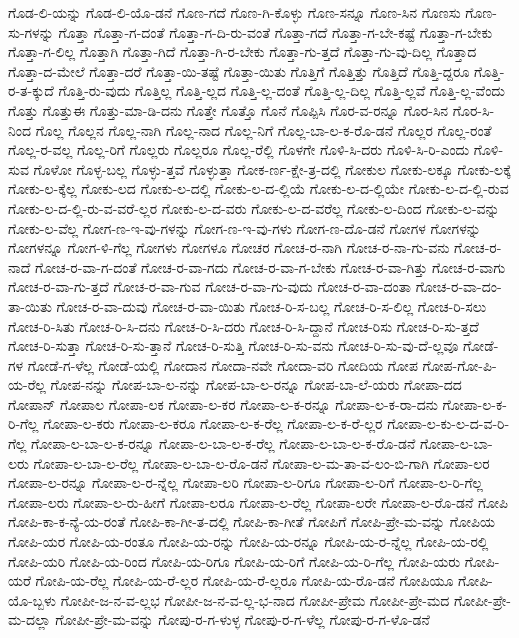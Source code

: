 {ಗೊಡ-ಲಿ-ಯನ್ನು
ಗೊಡ-ಲಿ-ಯೊ-ಡನೆ
ಗೊಣ-ಗದೆ
ಗೊಣ-ಗಿ-ಕೊಳ್ಳು
ಗೊಣ-ಸನ್ನೂ
ಗೊಣ-ಸಿನ
ಗೊಣಸು
ಗೊಣ-ಸು-ಗಳನ್ನು
ಗೊತ್ತಾ
ಗೊತ್ತಾ-ಗ-ದಂತೆ
ಗೊತ್ತಾ-ಗ-ದಿ-ರು-ವಂತೆ
ಗೊತ್ತಾ-ಗದೆ
ಗೊತ್ತಾ-ಗ-ಬೇ-ಕಷ್ಟೆ
ಗೊತ್ತಾ-ಗ-ಬೇಕು
ಗೊತ್ತಾ-ಗ-ಲಿಲ್ಲ
ಗೊತ್ತಾಗಿ
ಗೊತ್ತಾ-ಗಿದೆ
ಗೊತ್ತಾ-ಗಿ-ರ-ಬೇಕು
ಗೊತ್ತಾ-ಗು-ತ್ತದೆ
ಗೊತ್ತಾ-ಗು-ವು-ದಿಲ್ಲ
ಗೊತ್ತಾದ
ಗೊತ್ತಾ-ದ-ಮೇಲೆ
ಗೊತ್ತಾ-ದರೆ
ಗೊತ್ತಾ-ಯಿ-ತಷ್ಟೆ
ಗೊತ್ತಾ-ಯಿತು
ಗೊತ್ತಿಗೆ
ಗೊತ್ತಿತ್ತು
ಗೊತ್ತಿದೆ
ಗೊತ್ತಿ-ದ್ದರೂ
ಗೊತ್ತಿ-ರ-ತ-ಕ್ಕುದೆ
ಗೊತ್ತಿ-ರು-ವುದು
ಗೊತ್ತಿಲ್ಲ
ಗೊತ್ತಿ-ಲ್ಲದ
ಗೊತ್ತಿ-ಲ್ಲ-ದಂತೆ
ಗೊತ್ತಿ-ಲ್ಲ-ದಿಲ್ಲ
ಗೊತ್ತಿ-ಲ್ಲವೆ
ಗೊತ್ತಿ-ಲ್ಲ-ವೆಂದು
ಗೊತ್ತು
ಗೊತ್ತುಈ
ಗೊತ್ತು-ಮಾ-ಡಿ-ದನು
ಗೊತ್ತೇ
ಗೊತ್ತೊ
ಗೊನೆ
ಗೊಪ್ಪಿಸಿ
ಗೊರ-ವ-ರನ್ನೂ
ಗೊರ-ಸಿನ
ಗೊರ-ಸಿ-ನಿಂದ
ಗೊಲ್ಲ
ಗೊಲ್ಲನ
ಗೊಲ್ಲ-ನಾಗಿ
ಗೊಲ್ಲ-ನಾದ
ಗೊಲ್ಲ-ನಿಗೆ
ಗೊಲ್ಲ-ಬಾ-ಲ-ಕ-ರೊ-ಡನೆ
ಗೊಲ್ಲರ
ಗೊಲ್ಲ-ರಂತೆ
ಗೊಲ್ಲ-ರ-ವಲ್ಲ
ಗೊಲ್ಲ-ರಿಗೆ
ಗೊಲ್ಲರು
ಗೊಲ್ಲರೂ
ಗೊಲ್ಲ-ರೆಲ್ಲಿ
ಗೊಳಗೇ
ಗೊಳಿ-ಸಿ-ದರು
ಗೊಳಿ-ಸಿ-ರಿ-ಎಂದು
ಗೊಳಿ-ಸುವ
ಗೊಳೋ
ಗೊಳ್ಳ-ಬಲ್ಲ
ಗೊಳ್ಳು-ತ್ತವೆ
ಗೊಳ್ಳುತ್ತಾ
ಗೋಕ-ರ್ಣ-ಕ್ಷೇ-ತ್ರ-ದಲ್ಲಿ
ಗೋಕುಲ
ಗೋಕು-ಲಕ್ಕೂ
ಗೋಕು-ಲಕ್ಕೆ
ಗೋಕು-ಲ-ಕ್ಕೆಲ್ಲ
ಗೋಕು-ಲದ
ಗೋಕು-ಲ-ದಲ್ಲಿ
ಗೋಕು-ಲ-ದ-ಲ್ಲಿಯೆ
ಗೋಕು-ಲ-ದ-ಲ್ಲಿಯೇ
ಗೋಕು-ಲ-ದ-ಲ್ಲಿ-ರುವ
ಗೋಕು-ಲ-ದ-ಲ್ಲಿ-ರು-ವ-ವರೆ-ಲ್ಲರ
ಗೋಕು-ಲ-ದ-ವರು
ಗೋಕು-ಲ-ದ-ವರೆಲ್ಲ
ಗೋಕು-ಲ-ದಿಂದ
ಗೋಕು-ಲ-ವನ್ನು
ಗೋಕು-ಲ-ವೆಲ್ಲ
ಗೋಗ-ಣ-ಇ-ವು-ಗಳನ್ನು
ಗೋಗ-ಣ-ಇ-ವು-ಗಳು
ಗೋಗ-ಣ-ದೊ-ಡನೆ
ಗೋಗಳ
ಗೋಗಳನ್ನು
ಗೋಗಳನ್ನೂ
ಗೋಗ-ಳಿ-ಗೆಲ್ಲ
ಗೋಗಳು
ಗೋಗಳೂ
ಗೋಚರ
ಗೋಚ-ರ-ನಾಗಿ
ಗೋಚ-ರ-ನಾ-ಗು-ವನು
ಗೋಚ-ರ-ನಾದೆ
ಗೋಚ-ರ-ವಾ-ಗ-ದಂತೆ
ಗೋಚ-ರ-ವಾ-ಗದು
ಗೋಚ-ರ-ವಾ-ಗ-ಬೇಕು
ಗೋಚ-ರ-ವಾ-ಗಿತ್ತು
ಗೋಚ-ರ-ವಾಗು
ಗೋಚ-ರ-ವಾ-ಗು-ತ್ತದೆ
ಗೋಚ-ರ-ವಾ-ಗುವ
ಗೋಚ-ರ-ವಾ-ಗು-ವುದು
ಗೋಚ-ರ-ವಾ-ದಂತಾ
ಗೋಚ-ರ-ವಾ-ದಂ-ತಾ-ಯಿತು
ಗೋಚ-ರ-ವಾ-ದುವು
ಗೋಚ-ರ-ವಾ-ಯಿತು
ಗೋಚ-ರಿ-ಸ-ಬಲ್ಲ
ಗೋಚ-ರಿ-ಸ-ಲಿಲ್ಲ
ಗೋಚ-ರಿ-ಸಲು
ಗೋಚ-ರಿ-ಸಿತು
ಗೋಚ-ರಿ-ಸಿ-ದನು
ಗೋಚ-ರಿ-ಸಿ-ದರು
ಗೋಚ-ರಿ-ಸಿ-ದ್ದಾನೆ
ಗೋಚ-ರಿಸು
ಗೋಚ-ರಿ-ಸು-ತ್ತದೆ
ಗೋಚ-ರಿ-ಸುತ್ತಾ
ಗೋಚ-ರಿ-ಸು-ತ್ತಾನೆ
ಗೋಚ-ರಿ-ಸುತ್ತಿ
ಗೋಚ-ರಿ-ಸು-ವನು
ಗೋಚ-ರಿ-ಸು-ವು-ದೆ-ಲ್ಲವೂ
ಗೋಡೆ-ಗಳ
ಗೋಡೆ-ಗ-ಳೆಲ್ಲ
ಗೋಡೆ-ಯಲ್ಲಿ
ಗೋದಾನ
ಗೋದಾ-ನವೇ
ಗೋದಾ-ವರಿ
ಗೋದಿಯ
ಗೋಪ
ಗೋಪ-ಗೋ-ಪಿ-ಯ-ರೆಲ್ಲ
ಗೋಪ-ನನ್ನು
ಗೋಪ-ಬಾ-ಲ-ನನ್ನು
ಗೋಪ-ಬಾ-ಲ-ರನ್ನೂ
ಗೋಪ-ಬಾ-ಲೆ-ಯರು
ಗೋಪಾ-ದದ
ಗೋಪಾನ್
ಗೋಪಾಲ
ಗೋಪಾ-ಲಕ
ಗೋಪಾ-ಲ-ಕರ
ಗೋಪಾ-ಲ-ಕ-ರನ್ನೂ
ಗೋಪಾ-ಲ-ಕ-ರಾ-ದನು
ಗೋಪಾ-ಲ-ಕ-ರಿ-ಗೆಲ್ಲ
ಗೋಪಾ-ಲ-ಕರು
ಗೋಪಾ-ಲ-ಕರೂ
ಗೋಪಾ-ಲ-ಕ-ರೆಲ್ಲ
ಗೋಪಾ-ಲ-ಕ-ರೆ-ಲ್ಲರ
ಗೋಪಾ-ಲ-ಕು-ಲ-ದ-ವ-ರಿ-ಗೆಲ್ಲ
ಗೋಪಾ-ಲ-ಬಾ-ಲ-ಕ-ರನ್ನೂ
ಗೋಪಾ-ಲ-ಬಾ-ಲ-ಕ-ರೆಲ್ಲ
ಗೋಪಾ-ಲ-ಬಾ-ಲ-ಕ-ರೊ-ಡನೆ
ಗೋಪಾ-ಲ-ಬಾ-ಲರು
ಗೋಪಾ-ಲ-ಬಾ-ಲ-ರೆಲ್ಲ
ಗೋಪಾ-ಲ-ಬಾ-ಲ-ರೊ-ಡನೆ
ಗೋಪಾ-ಲ-ಮ-ತಾ-ವ-ಲಂ-ಬಿ-ಗಾಗಿ
ಗೋಪಾ-ಲರ
ಗೋಪಾ-ಲ-ರನ್ನೂ
ಗೋಪಾ-ಲ-ರ-ನ್ನೆಲ್ಲ
ಗೋಪಾ-ಲರಿ
ಗೋಪಾ-ಲ-ರಿಗೂ
ಗೋಪಾ-ಲ-ರಿಗೆ
ಗೋಪಾ-ಲ-ರಿ-ಗೆಲ್ಲ
ಗೋಪಾ-ಲರು
ಗೋಪಾ-ಲ-ರು-ಹೀಗೆ
ಗೋಪಾ-ಲರೂ
ಗೋಪಾ-ಲ-ರೆಲ್ಲ
ಗೋಪಾ-ಲರೇ
ಗೋಪಾ-ಲ-ರೊ-ಡನೆ
ಗೋಪಿ
ಗೋಪಿ-ಕಾ-ಕ-ನ್ಯೆ-ಯ-ರಂತೆ
ಗೋಪಿ-ಕಾ-ಗೀ-ತ-ದಲ್ಲಿ
ಗೋಪಿ-ಕಾ-ಗೀತೆ
ಗೋಪಿಗೆ
ಗೋಪಿ-ಪ್ರೇ-ಮ-ವನ್ನು
ಗೋಪಿಯ
ಗೋಪಿ-ಯರ
ಗೋಪಿ-ಯ-ರಂತೂ
ಗೋಪಿ-ಯ-ರನ್ನು
ಗೋಪಿ-ಯ-ರನ್ನೂ
ಗೋಪಿ-ಯ-ರ-ನ್ನೆಲ್ಲ
ಗೋಪಿ-ಯ-ರಲ್ಲಿ
ಗೋಪಿ-ಯರಿ
ಗೋಪಿ-ಯ-ರಿಂದ
ಗೋಪಿ-ಯ-ರಿಗೂ
ಗೋಪಿ-ಯ-ರಿಗೆ
ಗೋಪಿ-ಯ-ರಿ-ಗೆಲ್ಲ
ಗೋಪಿ-ಯರು
ಗೋಪಿ-ಯರೆ
ಗೋಪಿ-ಯ-ರೆಲ್ಲ
ಗೋಪಿ-ಯ-ರೆ-ಲ್ಲರ
ಗೋಪಿ-ಯ-ರೆ-ಲ್ಲರೂ
ಗೋಪಿ-ಯ-ರೊ-ಡನೆ
ಗೋಪಿಯೂ
ಗೋಪಿ-ಯೊ-ಬ್ಬಳು
ಗೋಪೀ-ಜ-ನ-ವ-ಲ್ಲಭ
ಗೋಪೀ-ಜ-ನ-ವ-ಲ್ಲ-ಭ-ನಾದ
ಗೋಪೀ-ಪ್ರೇಮ
ಗೋಪೀ-ಪ್ರೇ-ಮದ
ಗೋಪೀ-ಪ್ರೇ-ಮ-ದಲ್ಲಾ
ಗೋಪೀ-ಪ್ರೇ-ಮ-ವನ್ನು
ಗೋಪು-ರ-ಗ-ಳುಳ್ಳ
ಗೋಪು-ರ-ಗ-ಳೆಲ್ಲ
ಗೋಪು-ರ-ಗ-ಳೊ-ಡನೆ
}
